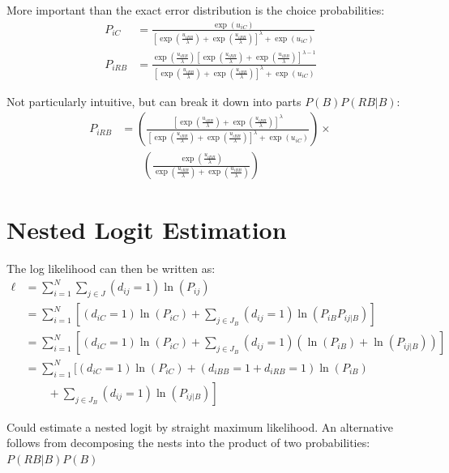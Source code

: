 \documentclass[11pt]{article}
\begin{document}
More important than the exact error distribution is the choice probabilities:
\begin{align*}
P_{iC}&=\frac{\exp(u_{iC})}{\left[\exp\left(\frac{u_{iRB}}{\lambda}\right)+\exp\left(\frac{u_{iBB}}{\lambda}\right)\right]^{\lambda}+\exp(u_{iC})}\\
P_{iRB}&=\frac{\exp\left(\frac{u_{iRB}}{\lambda}\right)\left[\exp\left(\frac{u_{iRB}}{\lambda}\right)+\exp\left(\frac{u_{iBB}}{\lambda}\right)\right]^{\lambda-1}}{\left[\exp\left(\frac{u_{iRB}}{\lambda}\right)+\exp\left(\frac{u_{iBB}}{\lambda}\right)\right]^{\lambda}+\exp(u_{iC})}
\end{align*}


Not particularly intuitive, but can break it down into parts \(P(B)P(RB|B)\):
\begin{align}
P_{iRB}&=\left(\frac{\left[\exp\left(\frac{u_{iRB}}{\lambda}\right)+\exp\left(\frac{u_{iBB}}{\lambda}\right)\right]^{\lambda}}{\left[\exp\left(\frac{u_{iRB}}{\lambda}\right)+\exp\left(\frac{u_{iBB}}{\lambda}\right)\right]^{\lambda}+\exp(u_{iC})}\right)\times\label{eq:pbus}\\
&\phantom{\times\times}\left(\frac{\exp\left(\frac{u_{iRB}}{\lambda}\right)}{\exp\left(\frac{u_{iRB}}{\lambda}\right)+\exp\left(\frac{u_{iBB}}{\lambda}\right)}\right)\nonumber
\end{align}

\section{Nested Logit Estimation}
\label{sec:org61e2e1c}

The log likelihood can then be written as:
\begin{align*}
\ell&=\sum_{i=1}^N\sum_{j\in J}(d_{ij}=1)\ln(P_{ij})\\
&= \sum_{i=1}^N\left[(d_{iC}=1)\ln(P_{iC})+\sum_{j\in J_B}(d_{ij}=1)\ln(P_{iB}P_{ij|B})\right]\\
&=\sum_{i=1}^N\left[(d_{iC}=1)\ln(P_{iC})+\sum_{j\in J_B}(d_{ij}=1)(\ln(P_{iB})+\ln(P_{ij|B}))\right]\\
&=\sum_{i=1}^N\Bigg[(d_{iC}=1)\ln(P_{iC})+(d_{iBB}=1+d_{iRB}=1)\ln(P_{iB})\\
&\qquad+\left.\sum_{j\in J_B}(d_{ij}=1)\ln(P_{ij|B})\right]
\end{align*}

Could estimate a nested logit by straight maximum likelihood.  An alternative follows from decomposing the nests into the product of two probabilities: \(P(RB|B)P(B)\)
\end{document}
